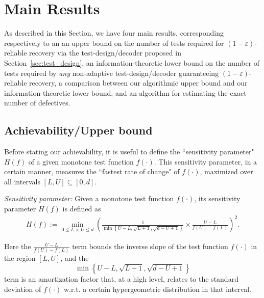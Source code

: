 \documentclass[onecolumn,letterpaper]{IEEEtran}
\newenvironment{customdef}[1]
  {\renewcommand\theinnercustomdef{#1}\innercustomdef}
  {\endinnercustomdef}
\newcommand{\up}{{U}}
\newcommand{\lw}{{L}}
\newcommand{\fH}{{H(f)}}
\newcommand{\sid}[1]{\textcolor{red}{#1}}
\newcommand{\xw}[1]{\textcolor{cyan}{#1}}
\begin{document}





\section{Main Results}
\label{sec:main_results}
As described in this Section, we have four main results, corresponding respectively to an an upper bound on the number of tests required for $(1-\varepsilon)$-reliable recovery via the test-design/decoder proposed in Section~\ref{sec:test_design}, an information-theoretic lower bound on the number of tests required by {\it any} non-adaptive test-design/decoder guaranteeing $(1-\varepsilon)$-reliable recovery, a comparison between our algorithmic upper bound and our information-theoretic lower bound, and an algorithm for estimating the exact number of defectives.


\subsection{Achievability/Upper bound} \label{subsec:ach}
Before stating our achievability, it is useful to define the ``sensitivity parameter" $\fH$ of a given monotone test function $f(\cdot)$. This sensitivity parameter, in a certain manner, measures the ``fastest rate of change" of $f(\cdot)$, maximized over all intervals $[\lw,\up] \subseteq [0,d]$. 



\begin{customdef}{8}\label{def:sensi:para}
{\it Sensitivity parameter:}  Given a monotone test function $f(\cdot)$, its sensitivity parameter $\fH$ is defined as 
\begin{align}
\label{eq:def:sensi:para}
     \fH:=\min_{0\leq \lw<\up \leq d} \left(\frac{1}{\min\left\{\up-\lw , \sqrt{\lw+1} , \sqrt{d-\up+1}\right\}}\times \frac{\up-\lw}{f(\up)-f(\lw)} \right)^2. 
\end{align} 
\end{customdef}


Here the $\frac{\up-\lw}{f(\up)-f(\lw)}$ term bounds the inverse slope of the test function $f(\cdot)$ in the region $[\lw,\up]$, and the $$\min\left\{\up-\lw , \sqrt{\lw+1} , \sqrt{d-\up+1}\right\}$$ term is an amortization factor that, at a high level, relates to the standard deviation of $f(\cdot)$ w.r.t. a certain hypergeometric distribution in that interval. 
\end{document}
